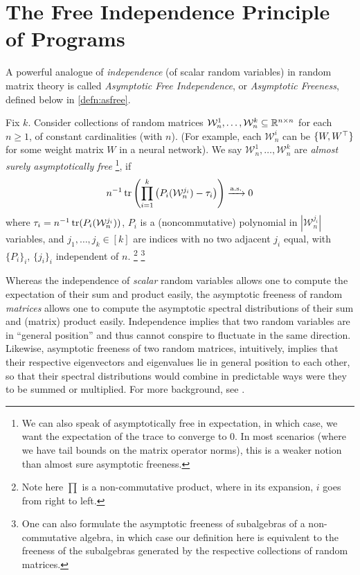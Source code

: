 \documentclass[main.tex]{subfiles}
\begin{document}
\section{The Free Independence Principle of \netsort{} Programs}
\label{sec:FIPMain}

A powerful analogue of \emph{independence} (of scalar random variables) in random matrix theory is called \emph{Asymptotic Free Independence}, or \emph{Asymptotic Freeness}, defined below in \cref{defn:asfree}.
\begin{defn}\label{defn:asfree}
    Fix $k$.
Consider collections of random matrices $\mathcal{W}_{n}^{1},\ldots,\mathcal{W}_{n}^{k}\subseteq\mathbb{R}^{n\times n}$ for each $n\ge1$, of constant cardinalities (with $n$).
(For example, each $\mathcal{W}_{n}^{i}$ can be $\{W, W^{\top}\}$ for some weight matrix $W$ in a neural network).
We say $\mathcal{W}_{n}^{1},\ldots,\mathcal{W}_{n}^{k}$ are \emph{almost surely asymptotically free}%
\footnote{
    We can also speak of asymptotically free in expectation, in which case, we want the expectation of the trace to converge to 0.
    In most scenarios (where we have tail bounds on the matrix operator norms), this is a weaker notion than almost sure asymptotic freeness.
}, if
\[
{n}^{-1} \operatorname{tr}\left(\prod_{i=1}^{k}\left(P_{i}(\mathcal{W}_{n}^{j_{i}})-\tau_{i}\right)\right)\xrightarrow{\mathrm{a.s.}} 0
\]
where $\tau_{i}={n}^{-1} \operatorname{tr}(P_{i}(\mathcal{W}_{n}^{j_{i}}))$, $P_{i}$ is a (noncommutative) polynomial in $|\mathcal W^{j_i}_n|$ variables, and $j_{1},\ldots,j_{k}\in[k]$ are indices with no two adjacent $j_{i}$ equal,
with $\{P_i\}_i$, $\{j_i\}_i$ independent of $n$.%
\footnote{
    Note here $\prod$ is a non-commutative product, where in its expansion, $i$ goes from right to left.
}
\footnote{One can also formulate the asymptotic freeness of subalgebras of a non-commutative algebra, in which case our definition here is equivalent to the freeness of the subalgebras generated by the respective collections of random matrices.}
\end{defn}

Whereas the independence of \emph{scalar} random variables allows one to compute the expectation of their sum and product easily, the asymptotic freeness of random \emph{matrices} allows one to compute the asymptotic spectral distributions of their sum and (matrix) product easily.
Independence implies that two random variables are in ``general position'' and thus cannot conspire to fluctuate in the same direction. Likewise, asymptotic freeness of two random matrices, intuitively, implies that their respective eigenvectors and eigenvalues lie in general position to each other, so that their spectral distributions would combine in predictable ways were they to be summed or multiplied. For more background, see \citep{tao_topics_2012}.
\end{document}
